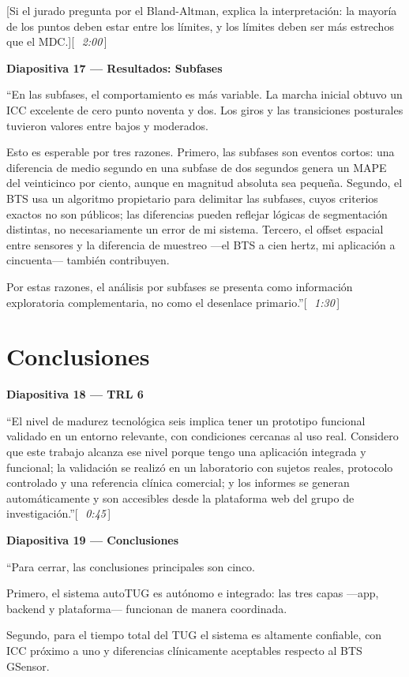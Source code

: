 \documentclass[12pt]{article}
\newcommand{\diap}[2]{%
  \begin{slidebox}
    \textbf{\color{slateblue}Diapositiva #1 — #2}
  \end{slidebox}%
}
\newcommand{\tiempo}[1]{\hfill{\small\color{timebox}[\,\textit{~#1}\,]}}
\begin{document}
[Si el jurado pregunta por el Bland-Altman, explica la interpretación: la mayoría de los puntos deben estar entre los límites, y los límites deben ser más estrechos que el MDC.]\tiempo{2:00}

\diap{17}{Resultados: Subfases}

``En las subfases, el comportamiento es más variable. La marcha inicial obtuvo un ICC excelente de cero punto noventa y dos. Los giros y las transiciones posturales tuvieron valores entre bajos y moderados.

Esto es esperable por tres razones. Primero, las subfases son eventos cortos: una diferencia de medio segundo en una subfase de dos segundos genera un MAPE del veinticinco por ciento, aunque en magnitud absoluta sea pequeña. Segundo, el BTS usa un algoritmo propietario para delimitar las subfases, cuyos criterios exactos no son públicos; las diferencias pueden reflejar lógicas de segmentación distintas, no necesariamente un error de mi sistema. Tercero, el offset espacial entre sensores y la diferencia de muestreo —el BTS a cien hertz, mi aplicación a cincuenta— también contribuyen.

Por estas razones, el análisis por subfases se presenta como información exploratoria complementaria, no como el desenlace primario.''\tiempo{1:30}

\section{Conclusiones}

\diap{18}{TRL 6}

``El nivel de madurez tecnológica seis implica tener un prototipo funcional validado en un entorno relevante, con condiciones cercanas al uso real. Considero que este trabajo alcanza ese nivel porque tengo una aplicación integrada y funcional; la validación se realizó en un laboratorio con sujetos reales, protocolo controlado y una referencia clínica comercial; y los informes se generan automáticamente y son accesibles desde la plataforma web del grupo de investigación.''\tiempo{0:45}

\diap{19}{Conclusiones}

``Para cerrar, las conclusiones principales son cinco.

Primero, el sistema autoTUG es autónomo e integrado: las tres capas —app, backend y plataforma— funcionan de manera coordinada.

Segundo, para el tiempo total del TUG el sistema es altamente confiable, con ICC próximo a uno y diferencias clínicamente aceptables respecto al BTS GSensor.
\end{document}
